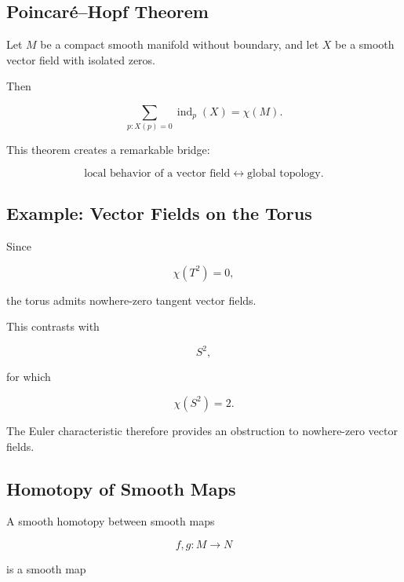 \subsection{Poincar\'e--Hopf Theorem}
\label{subsec:poincare-hopf}

\begin{theorem}
Let \(M\) be a compact smooth manifold without boundary, and let \(X\) be a
smooth vector field with isolated zeros.

Then

\[
\boxed{
\sum_{p:X(p)=0}
\operatorname{ind}_p(X)
=
\chi(M).
}
\]
\end{theorem}

This theorem creates a remarkable bridge:

\[
\boxed{
\text{local behavior of a vector field}
\longleftrightarrow
\text{global topology}.
}
\]

\subsection{Example: Vector Fields on the Torus}
\label{subsec:vector-fields-torus}

Since

\[
\chi(T^2)=0,
\]

the torus admits nowhere-zero tangent vector fields.

This contrasts with

\[
S^2,
\]

for which

\[
\chi(S^2)=2.
\]

The Euler characteristic therefore provides an obstruction to nowhere-zero
vector fields.

\subsection{Homotopy of Smooth Maps}
\label{subsec:smooth-homotopy}

A smooth homotopy between smooth maps

\[
f,g:M\to N
\]

is a smooth map

